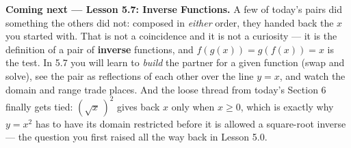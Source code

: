 \documentclass[10pt]{article}
\begin{document}
\begin{spiralbox}
\textbf{Coming next --- Lesson 5.7: Inverse Functions.} A few of today's pairs did something the
others did not: composed in \emph{either} order, they handed back the $x$ you started with. That is
not a coincidence and it is not a curiosity --- it is the definition of a pair of \textbf{inverse}
functions, and $f(g(x))=g(f(x))=x$ is the test. In 5.7 you will learn to \emph{build} the partner
for a given function (swap and solve), see the pair as reflections of each other over the line
$y=x$, and watch the domain and range trade places. And the loose thread from today's Section 6
finally gets tied: $\left(\sqrt{x}\,\right)^{2}$ gives back $x$ only when $x\ge0$, which is exactly
why $y=x^{2}$ has to have its domain restricted before it is allowed a square-root inverse --- the
question you first raised all the way back in Lesson 5.0.
\end{spiralbox}
\end{document}
